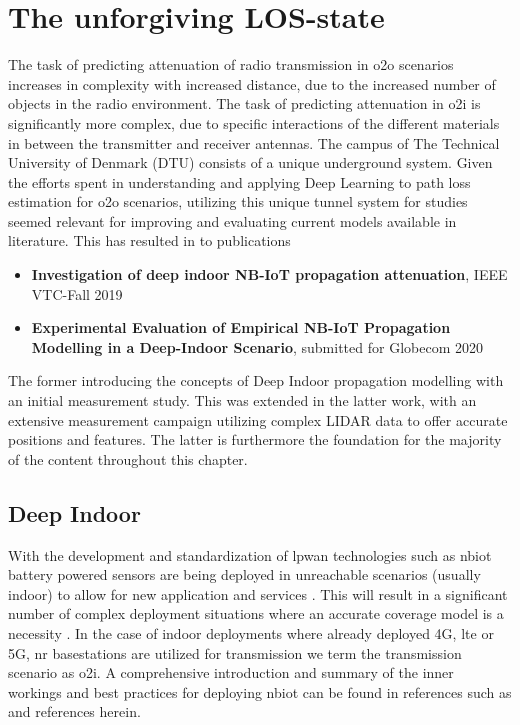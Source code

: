\chapter{The unforgiving LOS-state}\label{ch:deepindoor}
The task of predicting attenuation of radio transmission in \gls{o2o} scenarios increases in complexity with increased distance, due to the increased number of objects in the radio environment. The task of predicting attenuation in \gls{o2i} is significantly more complex, due to specific interactions of the different materials in between the transmitter and receiver antennas. The campus of The Technical University of Denmark (DTU) consists of a unique underground system. Given the efforts spent in understanding and applying Deep Learning to path loss estimation for \gls{o2o} scenarios, utilizing this unique tunnel system for studies seemed relevant for improving and evaluating current models available in literature. This has resulted in to publications

\begin{itemize}
    \item \textbf{Investigation of deep indoor NB-IoT propagation attenuation}, IEEE VTC-Fall 2019 \cite{Malarski2019InvestigationAttenuation}
    \item \textbf{Experimental Evaluation of Empirical NB-IoT Propagation Modelling in a Deep-Indoor Scenario}, submitted for Globecom 2020 \cite{Thrane2020ExperimentalScenario}
\end{itemize}

The former introducing the concepts of Deep Indoor propagation modelling with an initial measurement study. This was extended in the latter work, with an extensive measurement campaign utilizing complex LIDAR data to offer accurate positions and features. The latter is furthermore the foundation for the majority of the content throughout this chapter. 

\section{Deep Indoor}

With the development and standardization of \gls{lpwan} technologies such as \gls{nbiot} battery powered sensors are being deployed in unreachable scenarios (usually indoor) to allow for new application and services \cite{Sinha2017ANB-IoT}. This will result in a significant number of complex deployment situations where an accurate coverage model is a necessity \cite{Lauridsen2016CoverageArea, Vejlgaard2017}. In the case of indoor deployments where already deployed 4G, \gls{lte} or 5G, \gls{nr} basestations are utilized for transmission we term the transmission scenario as \gls{o2i}. A comprehensive introduction and summary of the inner workings and best practices for deploying \gls{nbiot} can be found in references such as \cite{Sinha2017ANB-IoT, Li2018SmartNB-IoT, Chen2017NarrowThings} and references herein.

